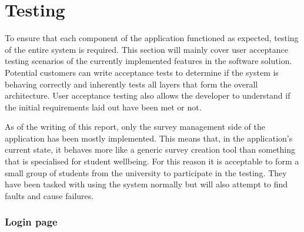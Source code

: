 \section{Testing} \label{testingsection}

To ensure that each component of the application functioned as expected, testing of the entire system is required.
This section will mainly cover user acceptance testing scenarios of the currently implemented features in the software solution.
Potential customers can write acceptance tests to determine if the system is behaving correctly \cite{miller2001acceptance} and 
inherently tests all layers that form the overall architecture.
User acceptance testing also allows the developer to understand if the initial requirements laid out have been met or not.

As of the writing of this report, only the survey management side of the application has been mostly implemented.
This means that, in the application's current state, it behaves more like a generic survey creation tool than something that is specialised
for student wellbeing.
For this reason it is acceptable to form a small group of students from the university to participate in the testing.
They have been tasked with using the system normally but will also attempt to find faults and cause failures.

\clearpage
\subsubsection{Login page}

